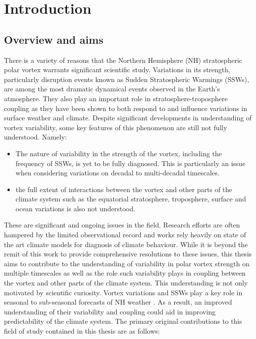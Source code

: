 \chapter{Introduction}
\label{cha:intro}

\section{Overview and aims}
\label{sec:overview}

There is a variety of reasons that the Northern Hemisphere (NH) stratospheric polar vortex warrants significant scientific study. Variations in its strength, particularly disruption events known as Sudden Stratospheric Warmings (SSWs), are among the most dramatic dynamical events observed in the Earth's atmosphere. They also play an important role in stratosphere-troposphere coupling as they have been shown to both respond to and influence variations in surface weather and climate. Despite significant developments in understanding of vortex variability, some key features of this phenomenon are still not fully understood. Namely: 

\begin{itemize}
    \item The nature of variability in the strength of the vortex, including the frequency of SSWs, is yet to be fully diagnosed. This is particularly an issue when considering variations on decadal to multi-decadal timescales.  
    
    \item the full extent of interactions between the vortex and other parts of the climate system such as the equatorial stratosphere, troposphere, surface and ocean variations is also not understood. 

\end{itemize}

These are significant and ongoing issues in the field. Research efforts are often hampered by the limited observational record and works rely heavily on state of the art climate models for diagnosis of climate behaviour. While it is beyond the remit of this work to provide comprehensive resolutions to these issues, this thesis aims to contribute to the understanding of variability in polar vortex strength on multiple timescales as well as the role such variability plays in coupling between the vortex and other parts of the climate system. This understanding is not only motivated by scientific curiosity. Vortex variations and SSWs play a key role in seasonal to sub-seasonal forecasts of NH weather \citep{scaifeSeasonal2016}. As a result, an improved understanding of their variability and coupling could aid in improving predictability of the climate system. The primary original contributions to this field of study contained in this thesis are as follows:


